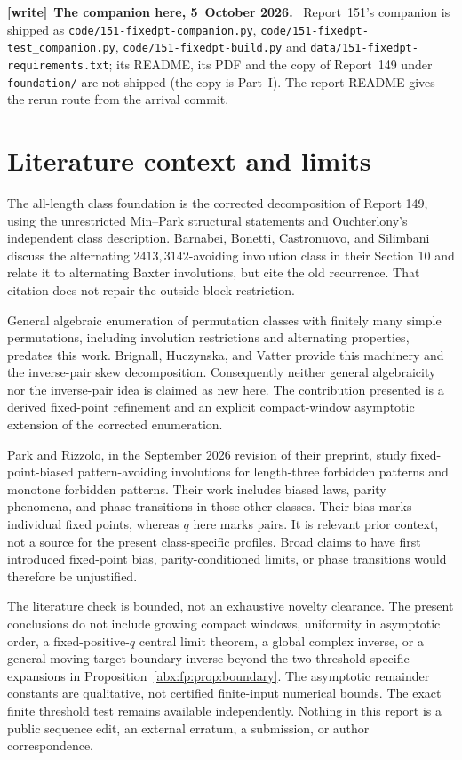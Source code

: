 \documentclass[11pt,letterpaper]{article}
\numberwithin{equation}{section}
\theoremstyle{remark}\newtheorem{remark}[theorem]{Remark}
\newcommand{\file}[1]{\nolinkurl{#1}}
\newenvironment{writenote}[1][]{\par\smallskip\begingroup\small
 \noindent\textbf{[write]}\if\relax\detokenize{#1}\relax\else~\textbf{#1.}\fi\ }%
 {\par\endgroup\smallskip}
\begin{document}
\begin{writenote}[The companion here, 5~October 2026]
Report~151's companion is shipped as \file{code/151-fixedpt-companion.py}, \file{code/151-fixedpt-test_companion.py}, \file{code/151-fixedpt-build.py} and \file{data/151-fixedpt-requirements.txt}; its README, its PDF and the copy of Report~149 under \file{foundation/} are not shipped (the copy is Part~I). The report README gives the rerun route from the arrival commit.
\end{writenote}

\section{Literature context and limits}\label{abx:fp:sec:literature}
The all-length class foundation is the corrected decomposition of
Report 149, using the unrestricted Min--Park structural statements and
Ouchterlony's independent class description. Barnabei, Bonetti,
Castronuovo, and Silimbani\cite{barnabei} discuss the alternating
$2413,3142$-avoiding involution class in their Section 10 and relate it
to alternating Baxter involutions, but cite the old recurrence. That
citation does not repair the outside-block restriction.

General algebraic enumeration of permutation classes with finitely many
simple permutations, including involution restrictions and alternating
properties, predates this work. Brignall, Huczynska, and Vatter\cite{BHV}
provide this machinery and the inverse-pair skew decomposition.
Consequently neither general algebraicity nor the inverse-pair idea is
claimed as new here. The contribution presented is a derived
fixed-point refinement and an explicit compact-window asymptotic
extension of the corrected enumeration.

Park and Rizzolo\cite{PR}, in the September 2026 revision of their
preprint, study fixed-point-biased pattern-avoiding involutions for
length-three forbidden patterns and monotone forbidden patterns.
Their work includes biased laws, parity phenomena, and phase
transitions in those other classes. Their bias marks individual fixed
points, whereas $q$ here marks pairs. It is relevant prior context,
not a source for the present class-specific profiles. Broad claims to
have first introduced fixed-point bias, parity-conditioned limits, or
phase transitions would therefore be unjustified.

The literature check is bounded, not an exhaustive novelty clearance.
The present conclusions do not include growing compact windows,
uniformity in asymptotic order, a fixed-positive-$q$ central limit
theorem, a global complex inverse, or a general moving-target boundary inverse beyond the two
threshold-specific expansions in Proposition~\ref{abx:fp:prop:boundary}.
The asymptotic remainder constants are qualitative, not certified
finite-input numerical bounds. The exact finite threshold test remains
available independently. Nothing in this report is a public sequence
edit, an external erratum, a submission, or author correspondence.
\end{document}
